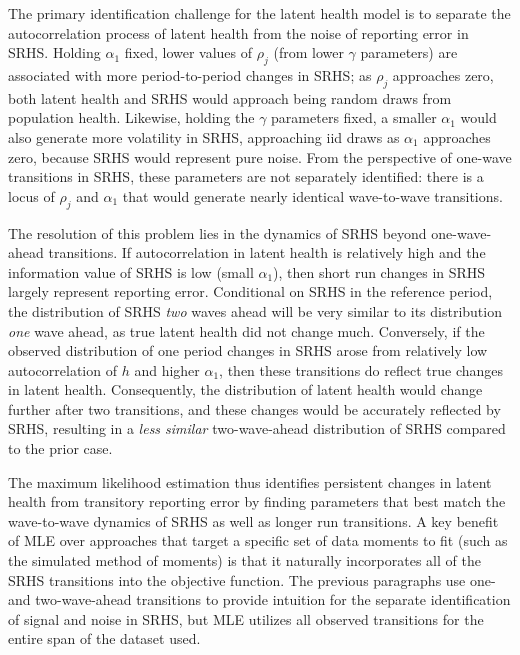 \documentclass[12pt,pdftex,letterpaper]{article}
\newcommand{\Health}{h}
\newcommand{\Age}{j}
\newcommand{\Corr}{\rho}
\newcommand{\CorrParam}{\gamma}
\newcommand{\LatentParam}{\alpha}
\begin{document}
The primary identification challenge for the latent health model is to separate the autocorrelation process of latent health from the noise of reporting error in SRHS.  Holding $\LatentParam_1$ fixed, lower values of $\Corr_\Age$ (from lower $\CorrParam$ parameters) are associated with more period-to-period changes in SRHS; as $\Corr_\Age$ approaches zero, both latent health and SRHS would approach being random draws from population health.  Likewise, holding the $\CorrParam$ parameters fixed, a smaller $\LatentParam_1$ would also generate more volatility in SRHS, approaching iid draws as $\LatentParam_1$ approaches zero, because SRHS would represent pure noise.  From the perspective of one-wave transitions in SRHS, these parameters are not separately identified: there is a locus of $\Corr_\Age$ and $\LatentParam_1$ that would generate nearly identical wave-to-wave transitions.

The resolution of this problem lies in the dynamics of SRHS beyond one-wave-ahead transitions.  If autocorrelation in latent health is relatively high and the information value of SRHS is low (small $\LatentParam_1$), then short run changes in SRHS largely represent reporting error.  Conditional on SRHS in the reference period, the distribution of SRHS \textit{two} waves ahead will be very similar to its distribution \textit{one} wave ahead, as true latent health did not change much.  Conversely, if the observed distribution of one period changes in SRHS arose from relatively low autocorrelation of $\Health$ and higher $\LatentParam_1$, then these transitions do reflect true changes in latent health.  Consequently, the distribution of latent health would change further after two transitions, and these changes would be accurately reflected by SRHS, resulting in a \textit{less similar} two-wave-ahead distribution of SRHS compared to the prior case.

The maximum likelihood estimation thus identifies persistent changes in latent health from transitory reporting error by finding parameters that best match the wave-to-wave dynamics of SRHS as well as longer run transitions.  A key benefit of MLE over approaches that target a specific set of data moments to fit (such as the simulated method of moments) is that it naturally incorporates all of the SRHS transitions into the objective function. The previous paragraphs use one- and two-wave-ahead transitions to provide intuition for the separate identification of signal and noise in SRHS, but MLE utilizes all observed transitions for the entire span of the dataset used.
\end{document}
